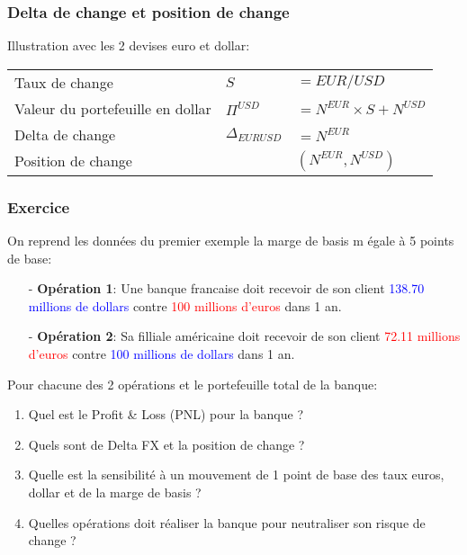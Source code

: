 \documentclass{beamer}
\begin{document}
\begin{frame}
\frametitle{Delta de change et position de change}
\small
Illustration avec les 2 devises euro et dollar:\\ 
\vspace{0.5cm}
\begin{tabular}{|l|l l|}
\hline
Taux de change&$S$&$= EUR/USD$\\
Valeur du portefeuille en dollar&$\Pi^{USD}$&$=N^{EUR} \times S + N^{USD}$\\
Delta de change&$\Delta_{EURUSD}$&$=N^{EUR}$\\
Position de change&&$(N^{EUR},N^{USD})$\\
\hline
\end{tabular}
\end{frame}

\begin{frame}
\frametitle{Exercice}
On reprend les données du premier exemple la marge de basis m égale à 5 points de base:\\
\begin{itemize}
\item[-] \textbf{Opération 1}: Une banque francaise doit recevoir de son client \textcolor{blue}{138.70 millions de dollars} contre \textcolor{red}{100 millions d'euros} dans 1 an.
\item[-] \textbf{Opération 2}: Sa filliale américaine doit recevoir de son client \textcolor{red}{72.11 millions d'euros} contre \textcolor{blue}{100 millions de dollars} dans 1 an.
\end{itemize}
Pour chacune des 2 opérations et le portefeuille total de la banque:\\
\begin{enumerate}
\item Quel est le Profit \& Loss (PNL) pour la banque ?
\item Quels sont de Delta FX et la position de change ?
\item Quelle est la sensibilité à un mouvement de 1 point de base des taux euros, dollar et de la marge de basis ?
\item Quelles opérations doit réaliser la banque pour neutraliser son risque de change ?
\end{enumerate}
\end{frame}
\end{document}
